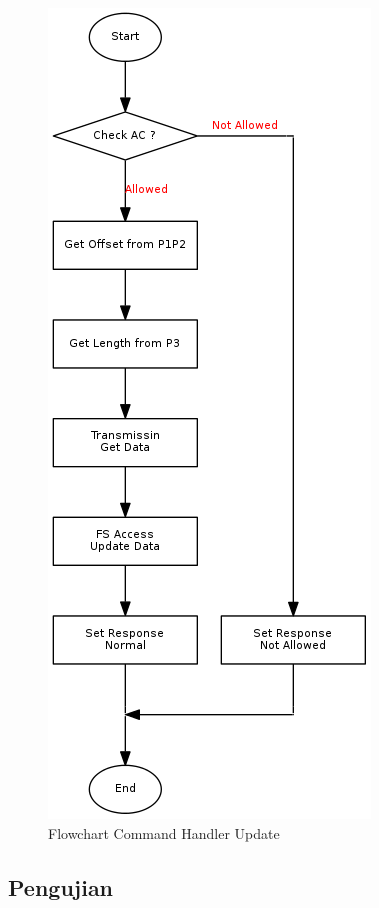 \begin{figure}[h]
\centering
\includegraphics[height=0.6\textheight]{image/command/flow_cmdupdate.png}
\caption{Flowchart Command Handler Update}
\label{fig-flow-cmdupdate}
\end{figure}

\subsection {Pengujian}

